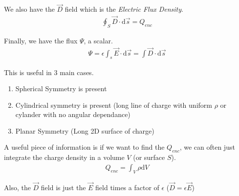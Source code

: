 \documentclass[12pt,letterpaper]{article} \usepackage{amsmath} \usepackage{graphicx} \usepackage[margin=1in]{geometry} \usepackage{longtable}  \usepackage{amssymb}
\begin{document}
	We also have the $\vec D$ field which is the \textit{Electric Flux Density}.
	\begin{align*}
		\oint_S \vec D \cdot \mathrm d \vec s = Q_{enc}
	\end{align*}
	
	Finally, we have the flux $\Psi$, a scalar. 
	\begin{align*}
		\Psi = \epsilon \int_s \vec E \cdot \mathrm d \vec s = \int \vec D \cdot \mathrm d \vec s
	\end{align*}

	This is useful in 3 main cases. 
	\begin{enumerate}[]
		\item Spherical Symmetry is present
		\item Cylindrical symmetry is present (long line of charge with uniform $\rho$ or cylander with no angular dependance)
		\item Planar Symmetry (Long 2D surface of charge)
	\end{enumerate}

	A useful piece of information is if we want to find the $Q_{enc}$, we can often just integrate the charge density in a volume $V$ (or surface $S$).
	\begin{align*}
		Q_{enc} = \int_V \rho \mathrm d V
	\end{align*}

	Also, the $\vec D$ field is just the $\vec E$ field times a factor of $\epsilon$ ($\vec D = \epsilon \vec E$) 
	
\end{document}
